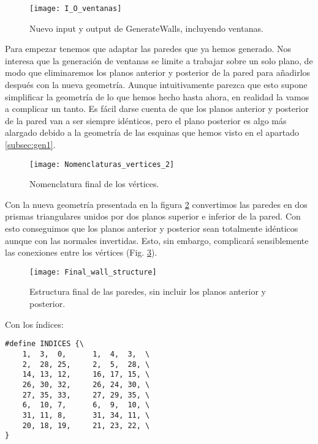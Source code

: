 \begin{figure}[H]
    \centering
    \texttt{[image: I\_O\_ventanas]}
    \caption{Nuevo input y output de GenerateWalls, incluyendo ventanas.}
    \label{fig:io_generatewindows}
\end{figure}

Para empezar tenemos que adaptar las paredes que ya hemos generado. Nos interesa que la generación de ventanas se limite a trabajar sobre un solo plano, de modo que eliminaremos los planos anterior y posterior de la pared para añadirlos después con la nueva geometría. Aunque intuitivamente parezca que esto supone simplificar la geometría de lo que hemos hecho hasta ahora, en realidad la vamos a complicar un tanto. Es fácil darse cuenta de que los planos anterior y posterior de la pared van a ser siempre idénticos, pero el plano posterior es algo más alargado debido a la geometría de las esquinas que hemos visto en el apartado \ref{subsec:gen1}.

\begin{figure}[H]
    \centering
    \texttt{[image: Nomenclaturas\_vertices\_2]}
    \caption{Nomenclatura final de los vértices.}
    \label{fig:nomenclatura_vertices_2}
\end{figure}

Con la nueva geometría presentada en la figura \ref{fig:nomenclatura_vertices_2} convertimos las paredes en dos prismas triangulares unidos por dos planos superior e inferior de la pared. Con esto conseguimos que los planos anterior y posterior sean totalmente idénticos aunque con las normales invertidas. Esto, sin embargo, complicará sensiblemente las conexiones entre los vértices (Fig. \ref{fig:nueva_estructura}).

\begin{figure}[H]
    \centering
    \texttt{[image: Final\_wall\_structure]}
    \caption{Estructura final de las paredes, sin incluir los planos anterior y posterior.}
    \label{fig:nueva_estructura}
\end{figure}

Con los índices:

\begin{lstlisting}
#define INDICES {\
    1,  3,  0,      1,  4,  3,  \
    2,  28, 25,     2,  5,  28, \
    14, 13, 12,     16, 17, 15, \
    26, 30, 32,     26, 24, 30, \
    27, 35, 33,     27, 29, 35, \
    6,  10, 7,      6,  9,  10, \
    31, 11, 8,      31, 34, 11, \
    20, 18, 19,     21, 23, 22, \
}
\end{lstlisting}


